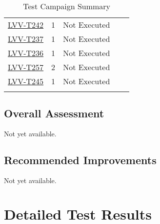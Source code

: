 \documentclass[SE,lsstdraft,STR,toc]{lsstdoc}
\begin{document}
{\begin{longtable}{p{2cm}cp{2.3cm}p{8.6cm}p{2.3cm}}
\begin{minipage}[]{9cm}
\medskip
\end{minipage}
&
\\\hline
\href{https://jira.lsstcorp.org/secure/Tests.jspa#/testCase/LVV-T242}{LVV-T242}
&  1
& Not Executed &
\begin{minipage}[]{9cm}
\smallskip

\medskip
\end{minipage}
&
\\\hline
\href{https://jira.lsstcorp.org/secure/Tests.jspa#/testCase/LVV-T237}{LVV-T237}
&  1
& Not Executed &
\begin{minipage}[]{9cm}
\smallskip

\medskip
\end{minipage}
&
\\\hline
\href{https://jira.lsstcorp.org/secure/Tests.jspa#/testCase/LVV-T236}{LVV-T236}
&  1
& Not Executed &
\begin{minipage}[]{9cm}
\smallskip

\medskip
\end{minipage}
&
\\\hline
\href{https://jira.lsstcorp.org/secure/Tests.jspa#/testCase/LVV-T257}{LVV-T257}
&  2
& Not Executed &
\begin{minipage}[]{9cm}
\smallskip

\medskip
\end{minipage}
&
\\\hline
\href{https://jira.lsstcorp.org/secure/Tests.jspa#/testCase/LVV-T245}{LVV-T245}
&  1
& Not Executed &
\begin{minipage}[]{9cm}
\smallskip

\medskip
\end{minipage}
&
\\\hline
\caption{Test Campaign Summary}
\label{table:summary}
\end{longtable}
}

\subsection{Overall Assessment}
\label{sect:overallassessment}

Not yet available.

\subsection{Recommended Improvements}
\label{sect:recommendations}

Not yet available.

\newpage
\section{Detailed Test Results}
\label{sect:detailedtestresults}
\end{document}
